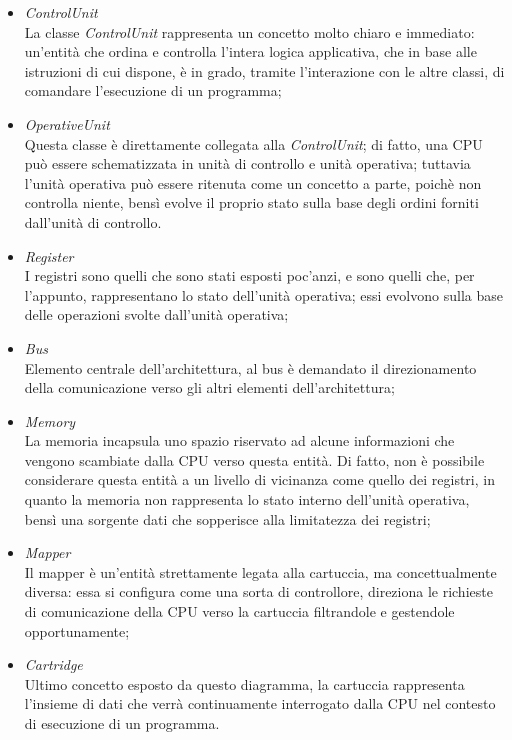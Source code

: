 \documentclass[11pt]{article}
\begin{document}
\begin{itemize}
	\item{
		\emph{ControlUnit}\\
		La classe \emph{ControlUnit} rappresenta un concetto molto chiaro e immediato: un'entità che ordina e controlla l'intera logica applicativa, che in base alle istruzioni di cui
		dispone, è in grado, tramite l'interazione con le altre classi, di comandare l'esecuzione di un programma;
	}
	\item{
		\emph{OperativeUnit}\\
		Questa classe è direttamente collegata alla \emph{ControlUnit}; di fatto, una CPU può essere schematizzata in unità di controllo e unità operativa; tuttavia l'unità operativa
		può essere ritenuta come un concetto a parte, poichè non controlla niente, bensì evolve il proprio stato sulla base degli ordini forniti dall'unità di controllo.
	}
	\item{
		\emph{Register}\\
		I registri sono quelli che sono stati esposti poc'anzi, e sono quelli che, per l'appunto, rappresentano lo stato dell'unità operativa; essi evolvono sulla base delle operazioni svolte
		dall'unità operativa;
	}
	\item{
		\emph{Bus}\\
		Elemento centrale dell'architettura, al bus è demandato il direzionamento della comunicazione verso gli altri elementi dell'architettura;
	}
	\item{
		\emph{Memory}\\
		La memoria incapsula uno spazio riservato ad alcune informazioni che vengono scambiate dalla CPU verso questa entità. Di fatto, non è possibile considerare questa
		entità a un livello di vicinanza come quello dei registri, in quanto la memoria non rappresenta lo stato interno dell'unità operativa, bensì una sorgente dati che sopperisce
		alla limitatezza dei registri;
	}
	\item{
		\emph{Mapper}\\
		Il mapper è un'entità strettamente legata alla cartuccia, ma concettualmente diversa: essa si configura come una sorta di controllore, direziona le richieste di comunicazione
		della CPU verso la cartuccia filtrandole e gestendole opportunamente;
	}
	\item{
		\emph{Cartridge}\\
		Ultimo concetto esposto da questo diagramma, la cartuccia rappresenta l'insieme di dati che verrà continuamente interrogato dalla CPU nel contesto di esecuzione di un 
		programma.
	}
\end{itemize}
\end{document}
